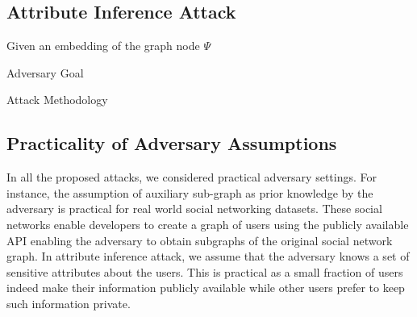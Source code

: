 \subsection{Attribute Inference Attack}

Given an embedding of the graph node $\Psi$

Adversary Goal

Attack Methodology


\subsection{Practicality of Adversary Assumptions}

In all the proposed attacks, we considered practical adversary settings.
For instance, the assumption of auxiliary sub-graph as prior knowledge by the adversary is practical for real world social networking datasets.
These social networks enable developers to create a graph of users using the publicly available API enabling the adversary to obtain subgraphs of the original social network graph.
In attribute inference attack,  we assume that the adversary knows a set of sensitive attributes about the users.
This is practical as a small fraction of users indeed make their information publicly available while other users prefer to keep such information private.
